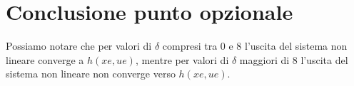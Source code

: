 \documentclass[a4paper, 11pt]{article}
\begin{document}
\section{Conclusione punto opzionale}
Possiamo notare che per valori di $\delta$ compresi tra 0 e 8 l'uscita del sistema non lineare converge a $h(xe,ue)$, mentre per valori di $\delta$ maggiori di 8 l'uscita del sistema non lineare non converge verso $h(xe,ue)$.
\end{document}
